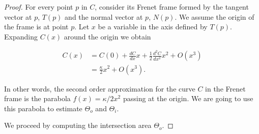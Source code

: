 \begin{proof} For every point $p$ in $C$, consider its Frenet frame formed by the tangent vector at $p$, $T(p)$ and the normal vector at $p$, $N(p)$. We assume the origin of the frame is at point $p$. Let $x$ be a variable in the axis defined by $T(p)$. Expanding $C(x)$ around the origin we obtain

\begin{align*}
	C(x) &= C(0) + \frac{dC}{dx}x + \frac{1}{2}\frac{d^2C}{dx^2}x^2 + O(x^3) \\
	&= \frac{\kappa}{2}x^2 + O(x^3).
\end{align*}

In other words, the second order approximation for the curve $C$ in the Frenet frame is the parabola $f(x) =  \kappa/2x^2$ passing at the origin. We are going to use this parabola to estimate $\Theta_o$ and $\Theta_i$.

We proceed by computing the intersection area $\Theta_o$.



\end{proof}
